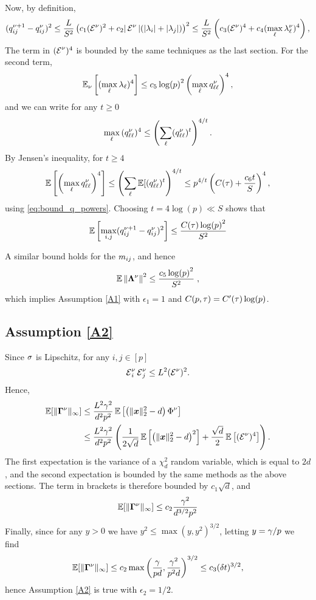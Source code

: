 Now, by definition,
\[ (q_{ij}^{\nu+1} - q_{ij}^\nu)^2 \leq \frac {L} {S^2} \left(c_1(\operatorname{{\cal E}}^\nu)^2 + c_2|\operatorname{{\cal E}}^\nu|(|\lambda_i| + |\lambda_j|) \right)^2 \leq \frac L {S^2} \left( c_3 (\operatorname{{\cal E}}^\nu)^4 + c_4 (\max_\ell \lambda^\nu_\ell)^4 \right), \]
The term in $(\operatorname{{\cal E}}^\nu)^4$ is bounded by the same techniques as the last section. For the second term,
\[ \operatorname{\mathbb{E}}_\nu\left[(\max_\ell \lambda_\ell)^4 \right] \leq c_5  \log(p)^2 \left(\max_\ell q^\nu_{\ell\ell} \right)^4, \]
and we can write for any $t \geq 0$
\[ \max_\ell{(q_{\ell \ell}^\nu)^4} \leq \left( \sum_{\ell} (q_{\ell\ell}^\nu)^t \right)^{4/t}. \]
By Jensen's inequality, for $t \geq 4$
\[ \operatorname{\mathbb{E}}\left[\left(\max_\ell{q_{\ell \ell}^\nu}\right)^4 \right] \leq \left( \sum_{\ell} \operatorname{\mathbb{E}}[(q_{\ell\ell}^\nu)^t \right)^{4/t} \leq p^{4/t} \left(C(\tau) +\frac{c_6 t}{S} \right)^4, \]
using \eqref{eq:bound_q_powers}. Choosing $t = 4 \log(p) \ll S$ shows that
\[ \operatorname{\mathbb{E}}\left[ \max_{i,j} (q_{ij}^{\nu+1} - q_{ij}^\nu)^2 \right] \leq \frac{C(\tau) \log(p)^2}{S^2}  \]


A similar bound holds for the $m_{ij}$, and hence
\begin{equation}
    \nonumber
     \operatorname{\mathbb{E}} \norm{ \bm{\Lambda}^\nu }^{2}  \leq \frac{c_5 \log(p)^2}{S^2} \;,
\end{equation}
which implies Assumption \ref{A1} with $\epsilon_1 = 1$ and $C(p, \tau) = C'(\tau)\log(p)$.

\subsection{Assumption \ref{A2}}
Since $\sigma$ is Lipschitz, for any $i, j \in [p]$
\[ \operatorname{{\cal E}}^\nu_i \operatorname{{\cal E}}^\nu_j \leq L^2 (\operatorname{{\cal E}}^\nu)^2. \]
Hence,
\begin{align*} 
\operatorname{\mathbb{E}}[\lVert\bm\Gamma^\nu\rVert_\infty] &\leq \frac{L^2 \gamma^2}{d^2p^2}\operatorname{\mathbb{E}}\left[\left(\lVert \bm{x} \rVert_2^2 - d \right) \Phi^\nu \right]\\ 
&\leq \frac{L^2 \gamma^2}{d^2p^2} \left(\frac1{2\sqrt{d}} \operatorname{\mathbb{E}}\left[ \left(\lVert \bm{x} \rVert_2^2 - d \right)^2 \right] + \frac{\sqrt{d}}2 \operatorname{\mathbb{E}}\left[ (\operatorname{{\cal E}}^\nu)^4 \right]\right).
\end{align*}
The first expectation is the variance of a $\chi^2_d$ random variable, which is equal to $2d$, and the second expectation is bounded by the same methods as the above sections. The term in brackets is therefore bounded by $c_1\sqrt{d}$, and
\[ \operatorname{\mathbb{E}}[\lVert\bm\Gamma^\nu\rVert_\infty] \leq c_2  \frac{\gamma^2}{d^{3/2}p^2} \]
Finally, since for any $y > 0$ we have $y^2 \leq \max(y, y^2)^{3/2}$, letting $y = \gamma/p$ we find
\[ \operatorname{\mathbb{E}}[\lVert\bm\Gamma^\nu\rVert_\infty] \leq c_2 \max\left( \frac{\gamma}{p d}, \frac{\gamma^2}{p^2 d}  \right)^{3/2} \leq c_3 (\delta t)^{3/2}, \]
hence Assumption \ref{A2} is true with $\epsilon_2 = 1/2$.

